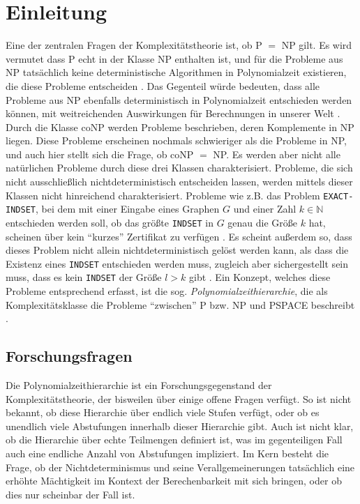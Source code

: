 \chapter{Einleitung}
Eine der zentralen Fragen der Komplexitätstheorie ist, ob P $=$ NP gilt.  Es wird vermutet dass P echt in der Klasse NP enthalten ist, und für die Probleme aus NP tatsächlich keine deterministische Algorithmen in Polynomialzeit existieren, die diese Probleme entscheiden \cite{sipser_introduction_2012}.
Das Gegenteil würde bedeuten, dass alle Probleme aus NP ebenfalls deterministisch in Polynomialzeit entschieden werden können, mit weitreichenden Auswirkungen für Berechnungen in unserer Welt \cite{arora_computational_2009}.
Durch die Klasse coNP werden Probleme beschrieben, deren Komplemente in NP liegen. Diese Probleme erscheinen nochmals schwieriger als die Probleme in NP, und auch hier stellt sich die Frage, ob coNP $=$ NP.
Es werden aber nicht alle natürlichen Probleme durch diese drei Klassen charakterisiert. Probleme, die sich nicht ausschließlich nichtdeterministisch entscheiden lassen, werden mittels dieser Klassen nicht hinreichend charakterisiert.
Probleme wie z.B. das Problem \texttt{EXACT-INDSET}, bei dem mit einer Eingabe eines Graphen $G$ und einer Zahl $k \in \mathbb{N}$ entschieden werden soll, ob das größte \texttt{INDSET} in $G$ genau die Größe $k$ hat,
scheinen über kein \enquote{kurzes} Zertifikat zu verfügen \cite{arora_computational_2009}. Es scheint außerdem so, dass dieses Problem nicht allein nichtdeterministisch gelöst werden kann, als dass die Existenz eines \texttt{INDSET} entschieden werden muss, zugleich aber sichergestellt sein muss, dass es kein \texttt{INDSET} der Größe $l > k$ gibt \cite{arora_computational_2009}. 
Ein Konzept, welches diese Probleme entsprechend erfasst, ist die sog. \emph{Polynomialzeithierarchie}, die als Komplexitätsklasse die Probleme \enquote{zwischen} P bzw. NP und PSPACE beschreibt \cite{arora_computational_2009}. 

\section{Forschungsfragen}
Die Polynomialzeithierarchie ist ein Forschungsgegenstand der Komplexitätstheorie, der bisweilen über einige offene Fragen verfügt. 
So ist nicht bekannt, ob diese Hierarchie über endlich viele Stufen verfügt, oder ob es unendlich viele Abstufungen innerhalb dieser Hierarchie gibt.
Auch ist nicht klar, ob die Hierarchie über echte Teilmengen definiert ist, was im gegenteiligen Fall auch eine endliche Anzahl von Abstufungen impliziert.
Im Kern besteht die Frage, ob der Nichtdeterminismus und seine Verallgemeinerungen tatsächlich eine erhöhte Mächtigkeit im Kontext der Berechenbarkeit mit sich bringen, oder ob dies nur scheinbar der Fall ist.

